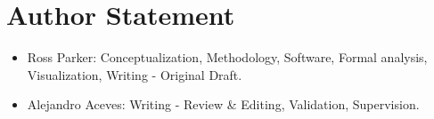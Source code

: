 \documentclass[12pt]{article}
\begin{document}
\section*{Author Statement}

\begin{itemize}

\item Ross Parker: Conceptualization, Methodology, Software, Formal analysis, Visualization, Writing - Original Draft. 

\item Alejandro Aceves: Writing - Review \& Editing, Validation, Supervision. 

\end{itemize}
\end{document}
